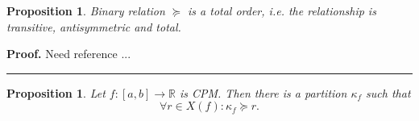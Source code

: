 \documentclass[12pt, a4paper]{article}
\newtheorem{proposition}[theorem]{Proposition}
\newenvironment{proof}[1][Proof]{\noindent \textbf{#1.} }{\  \rule{0.5em}{0.5em}}
\numberwithin{equation}{section}
\begin{document}
\begin{proposition}
  Binary relation $\succeq$ is a total order, i.e. the relationship is transitive, antisymmetric and total.
\end{proposition}
\begin{proof}  
   Need reference ...
\end{proof}  

\begin{proposition} \label{prop:kappaf}
  Let $f:[a,b] \rightarrow \mathbb{R}$ is CPM. Then there is a partition  
  $\kappa_f$ such that
  \begin{equation}\label{eq:Kappaf}
    \forall r \in X(f): \kappa_f \succeq r .
  \end{equation}
\end{proposition}
\end{document}

